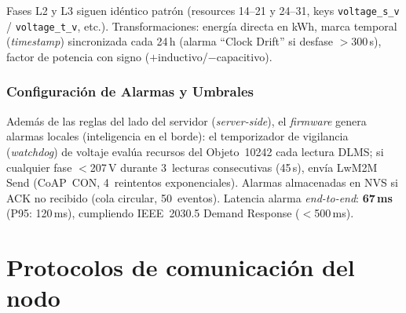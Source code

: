 Fases L2 y L3 siguen idéntico patrón (resources 14--21 y 24--31, keys \texttt{voltage\_s\_v} / \texttt{voltage\_t\_v}, etc.). Transformaciones: energía directa en kWh, marca temporal (\emph{timestamp}) sincronizada cada 24\,h (alarma ``Clock Drift'' si desfase $>$300\,s), factor de potencia con signo ($+$inductivo/$-$capacitivo).

\subsubsection{Configuración de Alarmas y Umbrales}
\label{sec:nodo-alarmas}

\begin{table}[H]
\centering
\caption{Reglas de alarma configuradas en perfil de dispositivo}
\label{tab:alarm-rules}
%
\end{table}

Además de las reglas del lado del servidor (\emph{server-side}), el \emph{firmware} genera alarmas locales (inteligencia en el borde): el temporizador de vigilancia (\emph{watchdog}) de voltaje evalúa recursos del Objeto~10242 cada lectura DLMS; si cualquier fase $<$207\,V durante 3~lecturas consecutivas (45\,s), envía LwM2M Send (CoAP~CON, 4~reintentos exponenciales). Alarmas almacenadas en NVS si ACK no recibido (cola circular, 50~eventos). Latencia alarma \emph{end-to-end}: \textbf{67\,ms} (P95: 120\,ms), cumpliendo IEEE~2030.5 Demand Response ($<$500\,ms).


\section{Protocolos de comunicación del nodo}
\label{sec:nodo-firmware}

